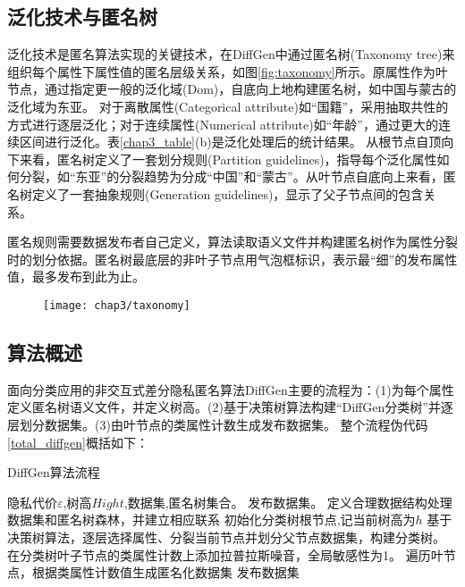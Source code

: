 \subsection{泛化技术与匿名树}

泛化技术是匿名算法实现的关键技术，在DiffGen中通过匿名树(Taxonomy tree)来组织每个属性下属性值的匿名层级关系，如图\ref{fig:taxonomy}所示。原属性作为叶节点，通过指定更一般的泛化域(Dom)，自底向上地构建匿名树，如中国与蒙古的泛化域为东亚。
对于离散属性(Categorical attribute)如“国籍”，采用抽取共性的方式进行逐层泛化；对于连续属性(Numerical attribute)如“年龄”，通过更大的连续区间进行泛化。表\ref{chap3_table}(b)是泛化处理后的统计结果。
从根节点自顶向下来看，匿名树定义了一套划分规则(Partition guidelines)，指导每个泛化属性如何分裂，如“东亚”的分裂趋势为分成“中国”和“蒙古”。从叶节点自底向上来看，匿名树定义了一套抽象规则(Generation guidelines)，显示了父子节点间的包含关系。

匿名规则需要数据发布者自己定义，算法读取语义文件并构建匿名树作为属性分裂时的划分依据。匿名树最底层的非叶子节点用气泡框标识，表示最“细”的发布属性值，最多发布到此为止。

\begin{figure}[!htp]
	\centering
	\texttt{[image: chap3/taxonomy]}
\end{figure}


\subsection{算法概述}

面向分类应用的非交互式差分隐私匿名算法DiffGen主要的流程为：(1)为每个属性定义匿名树语义文件，并定义树高。(2)基于决策树算法构建“DiffGen分类树”并逐层划分数据集。(3)由叶节点的类属性计数生成发布数据集。
整个流程伪代码\ref{total_diffgen}概括如下：

\begin{algorithm}[H]
	\caption{DiffGen算法流程} 
	\label{total_diffgen}
	\begin{algorithmic}[1]
		\REQUIRE 隐私代价$\varepsilon$,树高$Hight$,数据集,匿名树集合。
		\ENSURE 发布数据集。
		\STATE 定义合理数据结构处理数据集和匿名树森林，并建立相应联系
		\STATE 初始化分类树根节点,记当前树高为$h$
		\STATE 基于决策树算法，逐层选择属性、分裂当前节点并划分父节点数据集，构建分类树。
		\ENDWHILE
		\STATE 在分类树叶子节点的类属性计数上添加拉普拉斯噪音，全局敏感性为1。
		\STATE 遍历叶节点，根据类属性计数值生成匿名化数据集
		\RETURN 发布数据集
	\end{algorithmic}
\end{algorithm}

